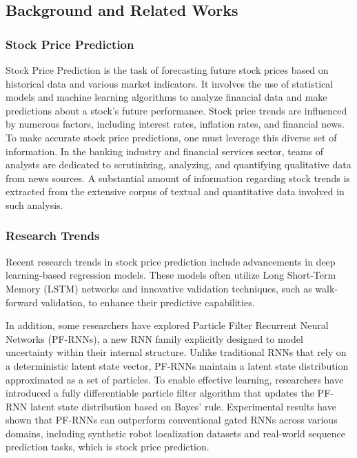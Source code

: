 \subsection{Background and Related Works}

\subsubsection{Stock Price Prediction}
Stock Price Prediction is the task of forecasting future stock prices based on historical data and various market indicators. 
It involves the use of statistical models and machine learning algorithms to analyze financial data and make predictions about a stock's future performance. 
Stock price trends are influenced by numerous factors, including interest rates, inflation rates, and financial news. 
To make accurate stock price predictions, one must leverage this diverse set of information. 
In the banking industry and financial services sector, teams of analysts are dedicated to scrutinizing, analyzing, and quantifying qualitative data from news sources. 
A substantial amount of information regarding stock trends is extracted from the extensive corpus of textual and quantitative data involved in such analysis.

\subsubsection{Research Trends}
Recent research trends in stock price prediction include advancements in deep learning-based regression models. 
These models often utilize Long Short-Term Memory (LSTM) networks and innovative validation techniques, such as walk-forward validation, to enhance their predictive capabilities.

In addition, some researchers have explored Particle Filter Recurrent Neural Networks (PF-RNNs), a new RNN family explicitly designed to model uncertainty within their internal structure. 
Unlike traditional RNNs that rely on a deterministic latent state vector, PF-RNNs maintain a latent state distribution approximated as a set of particles. 
To enable effective learning, researchers have introduced a fully differentiable particle filter algorithm that updates the PF-RNN latent state distribution based on Bayes' rule. 
Experimental results have shown that PF-RNNs can outperform conventional gated RNNs across various domains, 
including synthetic robot localization datasets and real-world sequence prediction tasks, which is stock price prediction.

